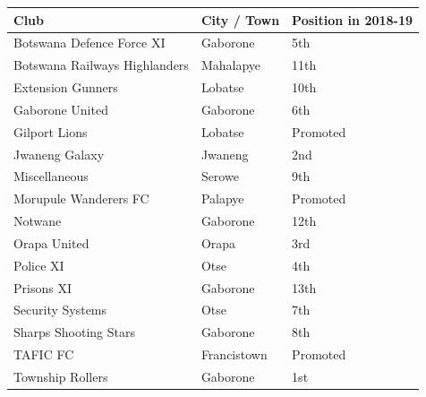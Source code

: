 \documentclass{article}
\begin{document}
\begin{tabular}{lll}
\toprule
Club & City / Town & Position in 2018-19 \\
\midrule
Botswana Defence Force XI & Gaborone & 5th \\
Botswana Railways Highlanders & Mahalapye & 11th \\
Extension Gunners & Lobatse & 10th \\
Gaborone United & Gaborone & 6th \\
Gilport Lions & Lobatse & Promoted \\
Jwaneng Galaxy & Jwaneng & 2nd \\
Miscellaneous & Serowe & 9th \\
Morupule Wanderers FC & Palapye & Promoted \\
Notwane & Gaborone & 12th \\
Orapa United & Orapa & 3rd \\
Police XI & Otse & 4th \\
Prisons XI & Gaborone & 13th \\
Security Systems & Otse & 7th \\
Sharps Shooting Stars & Gaborone & 8th \\
TAFIC FC & Francistown & Promoted \\
Township Rollers & Gaborone & 1st \\
\bottomrule
\end{tabular}
\end{document}
